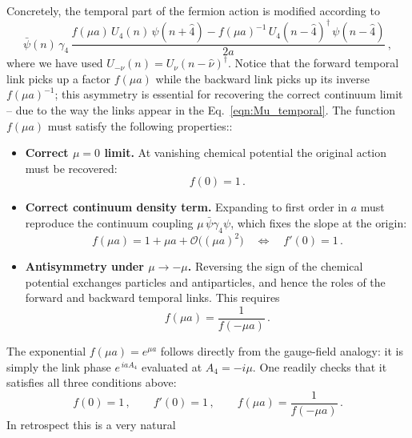 \documentclass[11pt]{article}
\newcommand{\sidefact}[1]{\marginnote{\footnotesize\textcolor{green!50!black}{#1}}}
\theoremstyle{definition}
\begin{document}
Concretely, the temporal part of the fermion action is modified
according to
\begin{equation}\label{eqn:Mu_temporal}
  \bar{\psi}(n)\,\gamma_4\,
  \frac{f(\mu a)\,U_4(n)\,\psi(n+\hat{4})
        -f(\mu a)^{-1}\,U_4(n-\hat{4})^{\dagger}\,\psi(n-\hat{4})}
       {2a}\,,
\end{equation}
where we have used $U_{-\nu}(n) = U_{\nu}(n-\hat{\nu})^{\dagger}$.
Notice that the forward temporal link picks up a factor $f(\mu a)$ while
the backward link picks up its inverse $f(\mu a)^{-1}$; this asymmetry is
essential for recovering the correct continuum limit -- due to the way the links appear in the Eq.~\ref{eqn:Mu_temporal}. The function $f(\mu a)$ must satisfy the following properties::
\begin{itemize}
  \item \textbf{Correct $\mu=0$ limit.} At vanishing chemical potential
  the original action must be recovered:
  \begin{equation}
    f(0) = 1\,.
  \end{equation}

  \item \textbf{Correct continuum density term.} Expanding to first order
  in $a$ must reproduce the continuum coupling $\mu\,\bar{\psi}\gamma_4\psi$,
  which fixes the slope at the origin:
  \begin{equation}
    f(\mu a) = 1 + \mu a + \mathcal{O}\!\big((\mu a)^2\big)
    \quad\Longleftrightarrow\quad
    f'(0) = 1\,.
  \end{equation}

  \item \textbf{Antisymmetry under $\mu \to -\mu$.} Reversing the sign of
  the chemical potential exchanges particles and antiparticles, and hence
  the roles of the forward and backward temporal links. This requires
  \begin{equation}
    f(\mu a) = \frac{1}{f(-\mu a)}\,.
  \end{equation}
\end{itemize}
The exponential $f(\mu a) = e^{\mu a}$ follows directly from the
gauge-field analogy: it is simply the link phase $e^{\,iaA_4}$ evaluated
at $A_4 = -i\mu$. One readily checks that it satisfies all three
conditions above:
\begin{equation}
  f(0) = 1\,, \qquad f'(0) = 1\,, \qquad
  f(\mu a) = \frac{1}{f(-\mu a)}\,.
\end{equation}
In retrospect this is a very natural
\sidefact{Recall how temperature was introduced in the last lecture by
Alessio.}%
\end{document}
